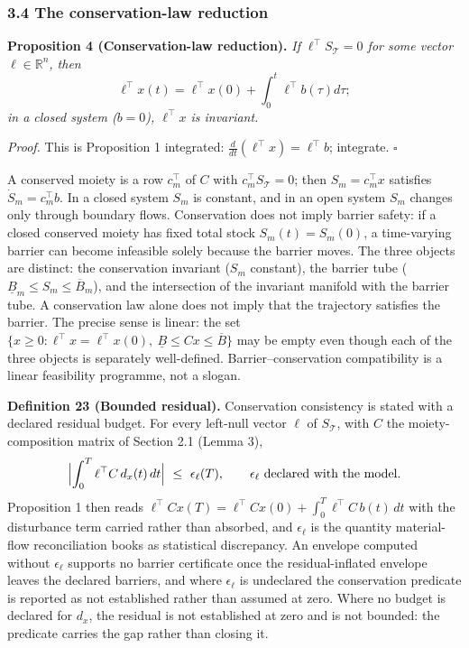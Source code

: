 \documentclass[11pt]{article}
\begin{document}
\subsubsection{3.4 The conservation-law
reduction}\label{the-conservation-law-reduction}

\textbf{Proposition 4 (Conservation-law reduction).} \emph{If
\(\ell^\top S_{\mathcal{T}} = 0\) for some vector
\(\ell \in \mathbb{R}^n\), then}
\[\ell^\top x(t) = \ell^\top x(0) + \int_0^t \ell^\top b(\tau) d\tau;\]
\emph{in a closed system (\(b = 0\)), \(\ell^\top x\) is invariant.}

\emph{Proof.} This is Proposition 1 integrated:
\(\frac{d}{dt}(\ell^\top x) = \ell^\top b\); integrate. \ensuremath{\square}

A conserved moiety is a row \(c_m^\top\) of \(C\) with
\(c_m^\top S_{\mathcal{T}} = 0\); then \(S_m = c_m^\top x\) satisfies
\(\dot S_m = c_m^\top b\). In a closed system \(S_m\) is constant, and
in an open system \(S_m\) changes only through boundary flows.
Conservation does not imply barrier safety: if a closed conserved moiety
has fixed total stock \(S_m(t) = S_m(0)\), a time-varying barrier can
become infeasible solely because the barrier moves. The three objects
are distinct: the conservation invariant (\(S_m\) constant), the barrier
tube (\(\underline{B}_m \le S_m \le \overline{B}_m\)), and the
intersection of the invariant manifold with the barrier tube. A
conservation law alone does not imply that the trajectory satisfies the
barrier. The precise sense is linear: the set
\(\{x \ge 0 : \ell^\top x = \ell^\top x(0),\ \underline{B} \le Cx \le \overline{B}\}\)
may be empty even though each of the three objects is separately
well-defined. Barrier--conservation compatibility is a linear
feasibility programme, not a slogan.

\textbf{Definition 23 (Bounded residual).} Conservation consistency is stated with a declared residual
budget. For every left-null vector \(\ell\) of \(S_{\mathcal{T}}\), with \(C\) the moiety-composition matrix of Section 2.1 (Lemma 3),
\[ \Bigl|\int_0^T\ell^{\top}C\,d_x(t)\,dt\Bigr|\ \le\ \epsilon_\ell(T), \qquad \epsilon_\ell\ \text{declared with the model}. \]
Proposition 1 then reads \(\ell^{\top}Cx(T)=\ell^{\top}Cx(0)+\int_0^T\ell^{\top}C\,b(t)\,dt\) with
the disturbance term carried rather than absorbed, and \(\epsilon_\ell\) is the quantity
material-flow reconciliation books as statistical discrepancy. An envelope computed without
\(\epsilon_\ell\) supports no barrier certificate once the residual-inflated envelope leaves the
declared barriers, and where \(\epsilon_\ell\) is undeclared the conservation predicate is reported
as not established rather than assumed at zero. Where no budget is declared for \(d_x\), the
residual is not established at zero and is not bounded: the predicate carries the gap rather than
closing it.
\end{document}
